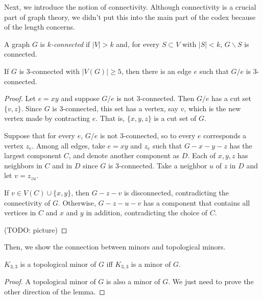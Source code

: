         Next, we introduce the notion of connectivity. Although connectivity is a crucial part of graph theory, we didn't put this into the main part of the codex because of the length concerns.
    
        \begin{defn}[Connectivity] \label{def_connectivity}
            A graph $G$ is \emph{$k$-connected} if $|V| > k$ and, for every $S \subset V$ with $|S| < k$, $G \backslash S$ is connected.
        \end{defn}
        
        \begin{thm} \label{thm_3conn}
            If $G$ is 3-connected with $|V(G)| \geq 5$, then there is an edge $e$ such that $G/e$ is 3-connected.
        \end{thm}
        
        \begin{proof}
            Let $e=xy$ and suppose $G/e$ is not 3-connected. Then $G/e$ has a cut set $\{v, z\}$. Since $G$ is 3-connected, this set has a vertex, say $v$, which is the new vertex made by contracting $e$. That is, $\{x, y, z\}$ is a cut set of $G$.
            
            Suppose that for every $e$, $G/e$ is not 3-connected, so to every $e$ corresponds a vertex $z_e$. Among all edges, take $e=xy$ and $z_e$ such that $G-x-y-z$ has the largest component $C$, and denote another component as $D$. Each of $x,y,z$ has neighbors in $C$ and in $D$ since $G$ is 3-connected. Take a neighbor $u$ of $z$ in $D$ and let $v=z_{zu}$.
            
            If $v \in V(C) \cup \{x,y\}$, then $G-z-v$ is disconnected, contradicting the connectivity of $G$. Otherwise, $G-z-u-v$ has a component that contains all vertices in $C$ and $x$ and $y$ in addition, contradicting the choice of $C$.
            
            (TODO: picture)
        \end{proof}
        
        Then, we show the connection between minors and topological minors.
        
        \begin{lemma} \label{lem_minor_K33}
            $K_{3,3}$ is a topological minor of $G$ iff $K_{3,3}$ is a minor of $G$.
        \end{lemma}
        
        \begin{proof}
            A topological minor of $G$ is also a minor of $G$. We just need to prove the other direction of the lemma.
            
            
        \end{proof}
        
